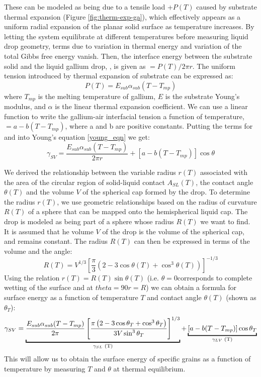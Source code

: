 These can be modeled as being due to a tensile load +$P(T)$ caused by substrate thermal expansion (Figure \ref{fig:therm-exp-ga}), which effectively appears as a uniform radial expansion of the planar solid surface as temperature increases. By letting the system equilibrate at different temperatures before measuring liquid drop geometry, terms due to variation in thermal energy and variation of the total Gibbs free energy vanish. Then, the interface energy between the substrate solid and the liquid gallium drop, \gamSL, is given as \gamSL$=P(T)/2\pi r$. The uniform tension introduced by thermal expansion of substrate can be expressed as:
\begin{equation}\label{uniform-tension}
	P(T) = E_{sub}\alpha_{sub}(T-T_{mp})
\end{equation}
where $T_{mp}$ is the melting temperature of gallium, $E$  is the substrate Young’s modulus, and $\alpha$ is the linear thermal expansion coefficient. We can use a linear function to write the gallium-air interfacial tension a function of temperature, \gamLV $= a-b(T-T_{mp})$, where a and b are positive constants.\cite{Hardy1985,Alchagirov2005} Putting the terms for \gamSL and \gamSV into Young’s equation \ref{young_eqn} we get\cite{Rudawska2009,Tadmor2004}:
\begin{equation*}%
	\gamma_{SV} =  \frac{E_{sub}\alpha_{sub}(T-T_{mp})}{2\pi r} + \left[a-b(T-T_{mp})\right]\cos\theta
\end{equation*}

We derived the relationship between the variable radius $r(T)$ associated with the area of the circular region of solid-liquid contact $A_{SL}(T)$, the contact angle $\theta(T)$ and the volume $V$ of the spherical cap formed by the drop. To determine the radius $r(T)$, we use geometric relationships based on the radius of curvature $R(T)$ of a sphere  that can be mapped onto the hemispherical liquid cap. The drop is modeled as being part of a sphere whose radius $R(T)$ we want to find. It is assumed that he volume $V$ of the drop is the volume of the spherical cap, and remains constant. The radius $R(T)$ can then be expressed in terms of the volume and the angle:
\begin{equation*}\label{drop-geom}
	R(T) = V^{1/3} \left[\frac{\pi}{3} \left(2-3\cos\theta(T)+\cos^{3}\theta(T)\right)\right]^{-1/3}
\end{equation*}
Using the relation $r(T)=R(T)\sin\theta(T)$ (i.e. $\theta=$0\degree corresponds to complete wetting of the surface and at $
theta=90$\degree $r=R$) we can obtain a formula for surface energy as a function of temperature $T$ and contact angle $\theta(T)$ (shown as $\theta_{T}$):
\begin{equation}\label{youngs-eqn-ga}
	\gamma_{SV} =  \underbracket{\frac{E_{sub}\alpha_{sub}(T-T_{mp})}{2\pi}\left[\frac{\pi\left(2-3\cos\theta_{T}+\cos^{3}\theta_{T}\right)}{3V\sin^{3}\theta_{T}} \right]^{1/3}}_{\text{\gamSL(T)}} + \underbracket{\left[a-b(T-T_{mp})\right]\cos\theta_{T}}_{\text{\gamLV(T)}}
\end{equation}
This will allow us to obtain the surface energy \gamSV of specific grains as a function of temperature by measuring $T$ and $\theta$ at thermal equilibrium.

